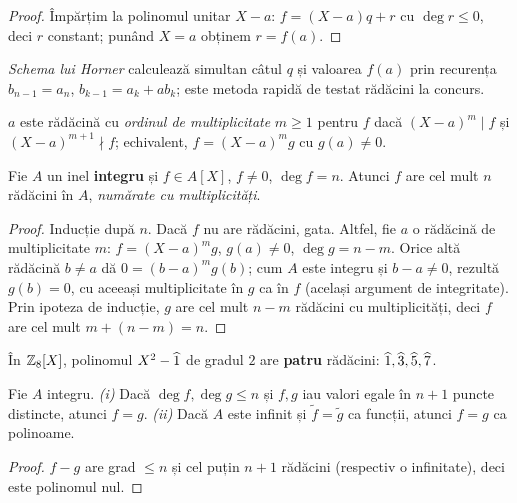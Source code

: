\begin{proof}
Împărțim la polinomul unitar $X-a$: $f=(X-a)q+r$ cu $\deg r\le0$, deci $r$ constant; punând $X=a$ obținem $r=f(a)$.
\end{proof}

\begin{observatie}
\emph{Schema lui Horner} calculează simultan câtul $q$ și valoarea $f(a)$ prin recurența $b_{n-1}=a_n$, $b_{k-1}=a_k+ab_k$; este metoda rapidă de testat rădăcini la concurs.
\end{observatie}

\begin{definitie}
$a$ este rădăcină cu \emph{ordinul de multiplicitate} $m\ge1$ pentru $f$ dacă $(X-a)^m\mid f$ și $(X-a)^{m+1}\nmid f$; echivalent, $f=(X-a)^m g$ cu $g(a)\neq0$.
\end{definitie}

\begin{teorema}\label{teo:numarradacini}
Fie $A$ un inel \textbf{integru} și $f\in A[X]$, $f\neq0$, $\deg f=n$. Atunci $f$ are cel mult $n$ rădăcini în $A$, \emph{numărate cu multiplicități}.
\end{teorema}

\begin{proof}
Inducție după $n$. Dacă $f$ nu are rădăcini, gata. Altfel, fie $a$ o rădăcină de multiplicitate $m$: $f=(X-a)^mg$, $g(a)\neq0$, $\deg g=n-m$. Orice altă rădăcină $b\neq a$ dă $0=(b-a)^m g(b)$; cum $A$ este integru și $b-a\neq0$, rezultă $g(b)=0$, cu aceeași multiplicitate în $g$ ca în $f$ (același argument de integritate). Prin ipoteza de inducție, $g$ are cel mult $n-m$ rădăcini cu multiplicități, deci $f$ are cel mult $m+(n-m)=n$.
\end{proof}

\begin{exemplu}
În $\mathbb{Z}_8[X]$, polinomul $X^2-\widehat{1}$ de gradul $2$ are \textbf{patru} rădăcini: $\widehat{1},\widehat{3},\widehat{5},\widehat{7}$.
\end{exemplu}

\begin{corolar}\label{cor:identitate}
Fie $A$ integru. \emph{(i)} Dacă $\deg f,\deg g\le n$ și $f,g$ iau valori egale în $n+1$ puncte distincte, atunci $f=g$. \emph{(ii)} Dacă $A$ este infinit și $\tilde f=\tilde g$ ca funcții, atunci $f=g$ ca polinoame.
\end{corolar}

\begin{proof}
$f-g$ are grad $\le n$ și cel puțin $n+1$ rădăcini (respectiv o infinitate), deci este polinomul nul.
\end{proof}

